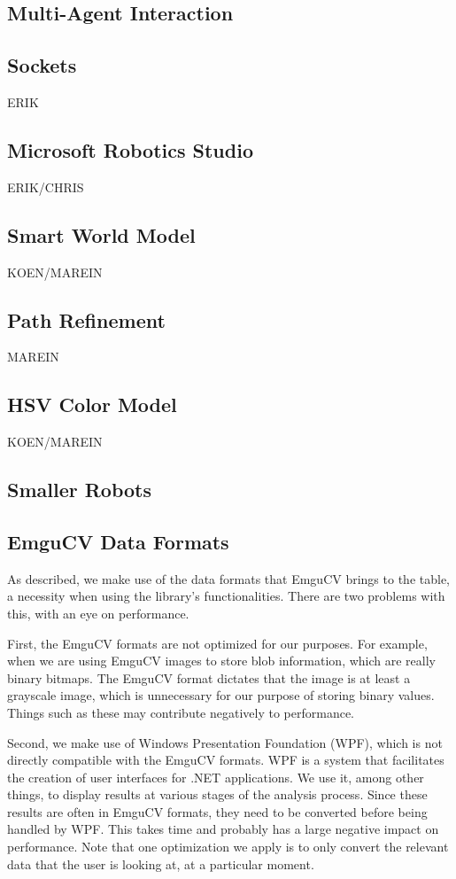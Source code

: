 \documentclass[10pt,twocolumn]{article}
\begin{document}
\subsection{Multi-Agent Interaction}

\subsection{Sockets}
ERIK

\subsection{Microsoft Robotics Studio}
ERIK/CHRIS

\subsection{Smart World Model}
KOEN/MAREIN

\subsection{Path Refinement}
MAREIN

\subsection{HSV Color Model}
KOEN/MAREIN

\subsection{Smaller Robots}

\subsection{EmguCV Data Formats}
As described, we make use of the data formats that EmguCV brings to the table, a necessity when using the library's functionalities. There are two problems with this, with an eye on performance.

First, the EmguCV formats are not optimized for our purposes. For example, when we are using EmguCV images to store blob information, which are really binary bitmaps. The EmguCV format dictates that the image is at least a grayscale image, which is unnecessary for our purpose of storing binary values. Things such as these may contribute negatively to performance.

Second, we make use of Windows Presentation Foundation (WPF), which is not directly compatible with the EmguCV formats. WPF is a system that facilitates the creation of user interfaces for .NET applications. We use it, among other things, to display results at various stages of the analysis process. Since these results are often in EmguCV formats, they need to be converted before being handled by WPF. This takes time and probably has a large negative impact on performance. Note that one optimization we apply is to only convert the relevant data that the user is looking at, at a particular moment.
\end{document}
